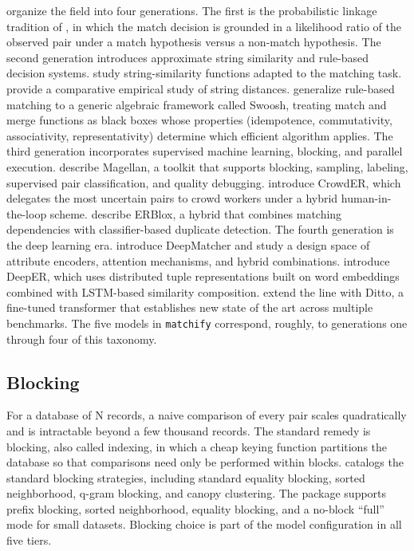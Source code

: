 \documentclass[10pt,letterpaper]{article}
\begin{document}
\citet{papadakis2021} organize the field into four generations. The
first is the probabilistic linkage tradition of \citet{fellegi1969},
in which the match decision is grounded in a likelihood ratio of the
observed pair under a match hypothesis versus a non-match hypothesis.
The second generation introduces approximate string similarity and
rule-based decision systems. \citet{bilenko2003} study
string-similarity functions adapted to the matching task.
\citet{cohen2003} provide a comparative empirical study of string
distances. \citet{benjelloun2009} generalize rule-based matching to a
generic algebraic framework called Swoosh, treating match and merge
functions as black boxes whose properties (idempotence, commutativity,
associativity, representativity) determine which efficient algorithm
applies. The third generation incorporates supervised machine
learning, blocking, and parallel execution. \citet{konda2016} describe
Magellan, a toolkit that supports blocking, sampling, labeling,
supervised pair classification, and quality debugging.
\citet{wang2012} introduce CrowdER, which delegates the most uncertain
pairs to crowd workers under a hybrid human-in-the-loop scheme.
\citet{bahmani2017} describe ERBlox, a hybrid that combines matching
dependencies with classifier-based duplicate detection. The fourth
generation is the deep learning era. \citet{mudgal2018} introduce
DeepMatcher and study a design space of attribute encoders, attention
mechanisms, and hybrid combinations. \citet{ebraheem2018} introduce
DeepER, which uses distributed tuple representations built on word
embeddings combined with LSTM-based similarity composition.
\citet{li2020} extend the line with Ditto, a fine-tuned transformer
that establishes new state of the art across multiple benchmarks. The
five models in \texttt{matchify} correspond, roughly, to generations
one through four of this taxonomy.

\subsection{Blocking}

For a database of N records, a naive comparison of every pair scales
quadratically and is intractable beyond a few thousand records. The
standard remedy is blocking, also called indexing, in which a cheap
keying function partitions the database so that comparisons need only
be performed within blocks. \citet{christen2012} catalogs the standard
blocking strategies, including standard equality blocking, sorted
neighborhood, q-gram blocking, and canopy clustering. The package
supports prefix blocking, sorted neighborhood, equality blocking, and
a no-block ``full'' mode for small datasets. Blocking choice is part
of the model configuration in all five tiers.
\end{document}
